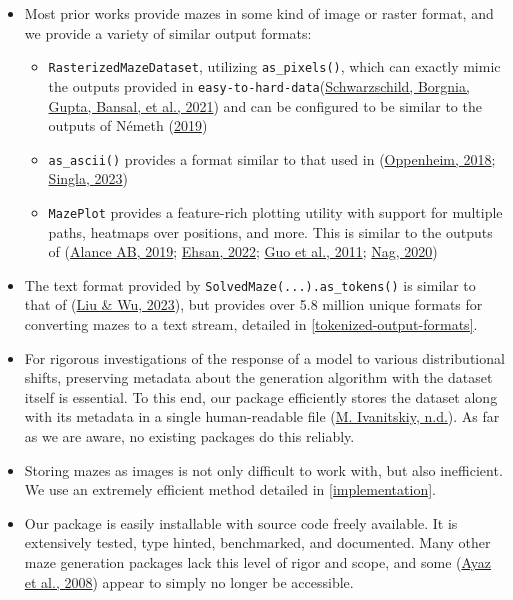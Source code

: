 \documentclass[10pt,a4paper,onecolumn]{article}
\providecommand{\tightlist}{%
  \setlength{\itemsep}{0pt}\setlength{\parskip}{0pt}}
\begin{document}
\begin{itemize}
\item
  Most prior works provide mazes in some kind of image or raster format,
  and we provide a variety of similar output formats:

  \begin{itemize}
  \tightlist
  \item
    \texttt{RasterizedMazeDataset}, utilizing \texttt{as\_pixels()},
    which can exactly mimic the outputs provided in
    \texttt{easy-to-hard-data}(\protect\hyperlink{ref-easy_to_hard}{Schwarzschild,
    Borgnia, Gupta, Bansal, et al., 2021}) and can be configured to be
    similar to the outputs of Németh
    (\protect\hyperlink{ref-gh_Nemeth_2019}{2019})
  \item
    \texttt{as\_ascii()} provides a format similar to that used in
    (\protect\hyperlink{ref-gh-oppenheimj2018maze}{Oppenheim, 2018};
    \protect\hyperlink{ref-eval-gpt-visual}{Singla, 2023})
  \item
    \texttt{MazePlot} provides a feature-rich plotting utility with
    support for multiple paths, heatmaps over positions, and more. This
    is similar to the outputs of
    (\protect\hyperlink{ref-mazegenerator-net}{Alance AB, 2019};
    \protect\hyperlink{ref-gh_Ehsan_2022}{Ehsan, 2022};
    \protect\hyperlink{ref-mathematica-maze}{Guo et al., 2011};
    \protect\hyperlink{ref-mdl-suite}{Nag, 2020})
  \end{itemize}
\item
  The text format provided by \texttt{SolvedMaze(...).as\_tokens()} is
  similar to that of (\protect\hyperlink{ref-eval-LLM-graphs}{Liu \& Wu,
  2023}), but provides over 5.8 million unique formats for converting
  mazes to a text stream, detailed in
  \autoref{tokenized-output-formats}.
\item
  For rigorous investigations of the response of a model to various
  distributional shifts, preserving metadata about the generation
  algorithm with the dataset itself is essential. To this end, our
  package efficiently stores the dataset along with its metadata in a
  single human-readable file (\protect\hyperlink{ref-zanj}{M.
  Ivanitskiy, n.d.}). As far as we are aware, no existing packages do
  this reliably.
\item
  Storing mazes as images is not only difficult to work with, but also
  inefficient. We use an extremely efficient method detailed in
  \autoref{implementation}.
\item
  Our package is easily installable with source code freely available.
  It is extensively tested, type hinted, benchmarked, and documented.
  Many other maze generation packages lack this level of rigor and
  scope, and some (\protect\hyperlink{ref-ayaz2008maze}{Ayaz et al.,
  2008}) appear to simply no longer be accessible.
\end{itemize}
\end{document}
